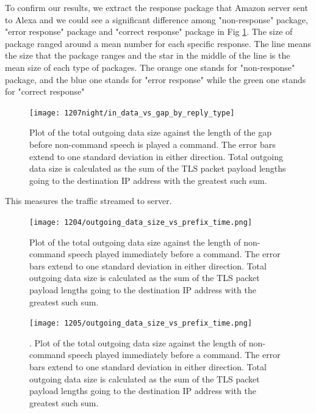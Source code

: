 To confirm our results, we extract the response package that Amazon server sent to Alexa and we could see a significant difference among "non-response" package, "error response" package and "correct response" package in Fig \ref{fig:postfix_variablegap_sizes}. The size of package ranged around a mean number for each specific response. The line means the size that the package ranges and the star in the middle of the line is the mean size of each type of packages. The orange one stands for "non-response" package, and the blue one stands for "error response" while the green one stands for "correct response" 

\begin{figure}[]
    \centering
    \texttt{[image: 1207night/in\_data\_vs\_gap\_by\_reply\_type]}
    \caption{Plot of the total outgoing data size against the length of the gap before non-command speech is played a command. The error bars extend to one standard deviation in either direction. Total outgoing data size is calculated as the sum of the TLS packet payload lengths going to the destination IP address with the greatest such sum.}
    \label{fig:postfix_variablegap_sizes}
\end{figure}

This measures the traffic streamed to server.


\begin{figure}[]
    \centering
    \texttt{[image: 1204/outgoing\_data\_size\_vs\_prefix\_time.png]}
    \caption{Plot of the total outgoing data size against the length of non-command speech played immediately before a command. The error bars extend to one standard deviation in either direction. Total outgoing data size is calculated as the sum of the TLS packet payload lengths going to the destination IP address with the greatest such sum.}
    \label{fig:prefix_many}
\end{figure}

\begin{figure}[]
    \centering
    \texttt{[image: 1205/outgoing\_data\_size\_vs\_prefix\_time.png]}
    \caption{. Plot of the total outgoing data size against the length of non-command speech played immediately before a command. The error bars extend to one standard deviation in either direction. Total outgoing data size is calculated as the sum of the TLS packet payload lengths going to the destination IP address with the greatest such sum.}
    \label{fig:prefix_two}
\end{figure}

